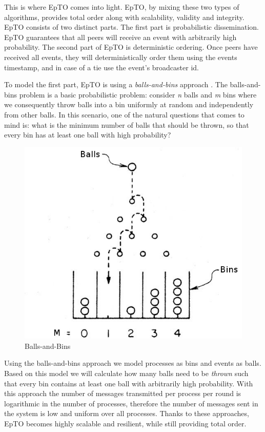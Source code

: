 \documentclass[10pt,conference,a4paper]{IEEEtran}
\begin{document}
This is where EpTO comes into light. EpTO, by mixing these two types of algorithms, provides total order along with scalability, validity and integrity. 
EpTO consists of two distinct parts. The first part is probabilistic dissemination. EpTO guarantees that all peers will receive an event with arbitrarily high probability. The second part of EpTO is deterministic ordering. Once peers have received all events, they will deterministically order them using the events timestamp, and in case of a tie use the event's broadcaster id.
\par
To model the first part, EpTO is using a \textit{balls-and-bins} approach \autocite{Koldehofe02simplegossiping}. The balls-and-bins problem is a basic probabilistic problem: consider \textit{n} balls and \textit{m} bins where we consequently throw balls into a bin uniformly at random and independently from other balls. In this scenario, one of the natural questions that comes to mind is: what is the minimum number of balls that should be thrown, so that every bin has at least one ball with high probability?
\begin{figure}
\includegraphics[width=\linewidth]{figures/BnB.jpeg}
\caption{Balls-and-Bins \autocite{bnb} }
\label{fig:balls-and-bins}
\end{figure}
\par
Using the balls-and-bins approach we model processes as bins and events as balls. Based on this model we will calculate how many balls need to be \textit{thrown} such that every bin contains at least one ball with arbitrarily high probability. With this approach the number of messages transmitted per process per round is logarithmic in the number of processes, therefore the number of messages sent in the system is low and uniform over all processes. Thanks to these approaches, EpTO becomes highly scalable and resilient, while still providing total order.
\end{document}
